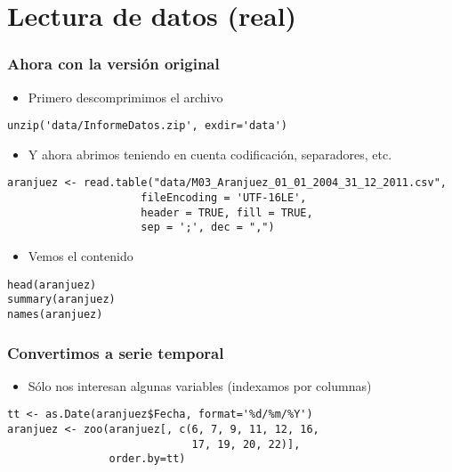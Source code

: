 \documentclass{beamer}
\begin{document}
\section{Lectura de datos (real)}
\label{sec-3}
\begin{frame}[fragile]
\frametitle{Ahora con la versión original}
\label{sec-3-1}

\begin{itemize}
\item Primero descomprimimos el archivo
\end{itemize}

\lstset{language=R}
\begin{lstlisting}
unzip('data/InformeDatos.zip', exdir='data')
\end{lstlisting}
\begin{itemize}
\item Y ahora abrimos teniendo en cuenta codificación, separadores, etc.
\end{itemize}

\lstset{language=R}
\begin{lstlisting}
aranjuez <- read.table("data/M03_Aranjuez_01_01_2004_31_12_2011.csv",
                     fileEncoding = 'UTF-16LE',
                     header = TRUE, fill = TRUE,
                     sep = ';', dec = ",")
\end{lstlisting}
\begin{itemize}
\item Vemos el contenido
\end{itemize}

\lstset{language=R}
\begin{lstlisting}
head(aranjuez)
summary(aranjuez)
names(aranjuez)
\end{lstlisting}
\end{frame}
\begin{frame}[fragile]
\frametitle{Convertimos a serie temporal}
\label{sec-3-2}

\begin{itemize}
\item Sólo nos interesan algunas variables (indexamos por columnas)
\end{itemize}

\lstset{language=R}
\begin{lstlisting}
tt <- as.Date(aranjuez$Fecha, format='%d/%m/%Y')
aranjuez <- zoo(aranjuez[, c(6, 7, 9, 11, 12, 16,
                             17, 19, 20, 22)],
                order.by=tt)
\end{lstlisting}
\end{frame}
\end{document}

